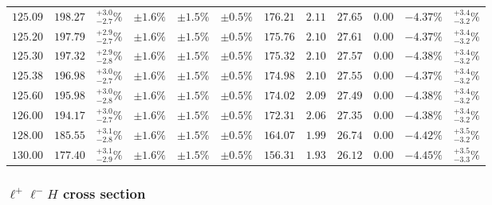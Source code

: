 \begin{landscape}
\begin{table}[ht!]
{\begin{tabular}{| cc | c | ccc | ccccc | c |}
$125.09$ & $198.27$ & $^{+3.0}_{-2.7}\%$ & $\pm 1.6\%$ & {\color{black!55}$\pm 1.5\%$} & {\color{black!55}$\pm 0.5\%$} & $176.21$ & $2.11$ & $27.65$ & $0.00$ & $-4.37\%$ & $^{+3.4}_{-3.2}\%$ \\
$125.20$ & $197.79$ & $^{+2.9}_{-2.7}\%$ & $\pm 1.6\%$ & {\color{black!55}$\pm 1.5\%$} & {\color{black!55}$\pm 0.5\%$} & $175.76$ & $2.10$ & $27.61$ & $0.00$ & $-4.37\%$ & $^{+3.4}_{-3.2}\%$ \\
$125.30$ & $197.32$ & $^{+2.9}_{-2.8}\%$ & $\pm 1.6\%$ & {\color{black!55}$\pm 1.5\%$} & {\color{black!55}$\pm 0.5\%$} & $175.32$ & $2.10$ & $27.57$ & $0.00$ & $-4.38\%$ & $^{+3.4}_{-3.2}\%$ \\
$125.38$ & $196.98$ & $^{+3.0}_{-2.7}\%$ & $\pm 1.6\%$ & {\color{black!55}$\pm 1.5\%$} & {\color{black!55}$\pm 0.5\%$} & $174.98$ & $2.10$ & $27.55$ & $0.00$ & $-4.37\%$ & $^{+3.4}_{-3.2}\%$ \\
$125.60$ & $195.98$ & $^{+3.0}_{-2.8}\%$ & $\pm 1.6\%$ & {\color{black!55}$\pm 1.5\%$} & {\color{black!55}$\pm 0.5\%$} & $174.02$ & $2.09$ & $27.49$ & $0.00$ & $-4.38\%$ & $^{+3.4}_{-3.2}\%$ \\
$126.00$ & $194.17$ & $^{+3.0}_{-2.7}\%$ & $\pm 1.6\%$ & {\color{black!55}$\pm 1.5\%$} & {\color{black!55}$\pm 0.5\%$} & $172.31$ & $2.06$ & $27.35$ & $0.00$ & $-4.38\%$ & $^{+3.4}_{-3.2}\%$ \\
$128.00$ & $185.55$ & $^{+3.1}_{-2.8}\%$ & $\pm 1.6\%$ & {\color{black!55}$\pm 1.5\%$} & {\color{black!55}$\pm 0.5\%$} & $164.07$ & $1.99$ & $26.74$ & $0.00$ & $-4.42\%$ & $^{+3.5}_{-3.2}\%$ \\
$130.00$ & $177.40$ & $^{+3.1}_{-2.9}\%$ & $\pm 1.6\%$ & {\color{black!55}$\pm 1.5\%$} & {\color{black!55}$\pm 0.5\%$} & $156.31$ & $1.93$ & $26.12$ & $0.00$ & $-4.45\%$ & $^{+3.5}_{-3.3}\%$ \\
\cline{1-12}
\end{tabular}
}
\end{table}







\FloatBarrier
\subsubsection{\texorpdfstring{$\ell^+ \ell^- H$}{l+ l- H} cross section}


\end{landscape}
